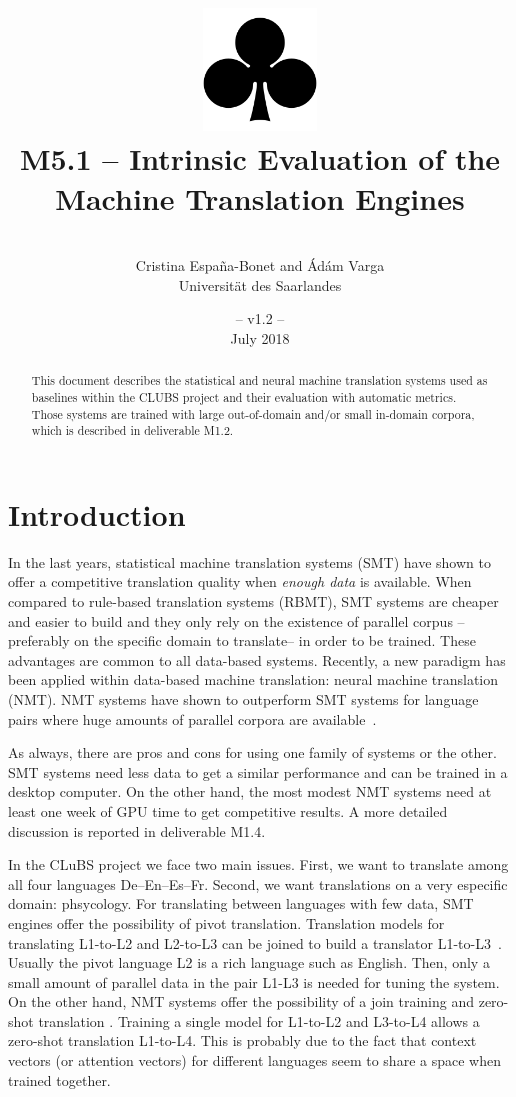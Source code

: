 \documentclass[a4paper,11pt]{article}
\title{
\includegraphics[width=3cm]{./img/200px-SuitClubs.png} \\
\Huge M5.1 -- Intrinsic Evaluation of the \\ Machine Translation Engines \\ 
}
\author{\vspace*{1cm}\\ \LARGE Cristina Espa\~na-Bonet and \'Ad\'am Varga \medskip \\ \Large Universit\"at des Saarlandes}
\date{\vspace*{2cm} -- v1.2 --\\July 2018}
\begin{document}
\clearpage\maketitle
\thispagestyle{empty}

\vspace*{5cm}
\begin{abstract}
This document describes the statistical and neural machine translation systems used as baselines within the CLUBS project and their evaluation with automatic metrics. Those systems are trained with large out-of-domain and/or small in-domain corpora, which is described in deliverable M1.2.
\end{abstract}

\newpage
\tableofcontents
\clearpage


\section{Introduction}
\label{s:intro}

In the last years, statistical machine translation systems (SMT) have shown to offer a competitive translation quality when \emph{enough data} is available. When compared to rule-based translation systems (RBMT), SMT systems are cheaper and easier to build and they only rely on the existence of parallel corpus --preferably on the specific domain to translate-- in order to be trained. These advantages are common to all data-based systems. Recently, a new paradigm has been applied within data-based machine translation: neural machine translation (NMT). NMT systems have shown to outperform SMT systems for language pairs where huge amounts of parallel corpora are available~\cite{WMT1:2016,WMT2:2017}.

As always, there are pros and cons for using one family of systems or the other. SMT systems need less data to get a similar performance and can be trained in a desktop computer. On the other hand, the most modest NMT systems need at least one week of GPU time to get competitive results. A more detailed discussion is reported in deliverable M1.4.

In the CLuBS project we face two main issues. First, we want to translate among all four languages De--En--Es--Fr. Second, we want translations on a very especific domain: phsycology. For translating between languages with few data, SMT engines offer the possibility of pivot translation. Translation models for translating L1-to-L2 and L2-to-L3 can be joined to build a translator L1-to-L3~\cite{zhuEtal:2014}. Usually the pivot language L2 is a rich language such as English. Then, only a small amount of parallel data in the pair L1-L3 is needed for tuning the system. On the other hand, NMT systems offer the possibility of a join training and zero-shot translation \cite{johnsonEtal:2016,haEtal:2016,firatEtAlb:2016}. Training a single model for L1-to-L2 and L3-to-L4 allows a zero-shot translation L1-to-L4. This is probably due to the fact that context vectors (or attention vectors) for different languages seem to share a space when trained together. 
\end{document}
